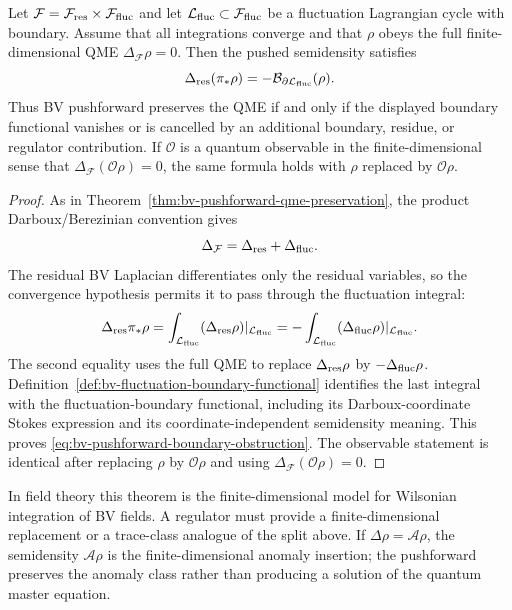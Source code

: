 \begin{proposition}
\label{prop:bv-pushforward-boundary-obstruction}
Let \(\mathcal F=\mathcal F_{\rm res}\times\mathcal F_{\rm fluc}\) and let
\(\mathcal L_{\rm fluc}\subset\mathcal F_{\rm fluc}\) be a fluctuation
Lagrangian cycle with boundary.  Assume that all integrations converge and
that \(\rho\) obeys the full finite-dimensional QME
\(\Delta_{\mathcal F}\rho=0\).  Then the pushed semidensity satisfies
\begin{equation}
  \Delta_{\rm res}(\pi_*\rho)
  =
  -\mathcal B_{\partial\mathcal L_{\rm fluc}}(\rho).
  \label{eq:bv-pushforward-boundary-obstruction}
\end{equation}
Thus BV pushforward preserves the QME if and only if the displayed boundary
functional vanishes or is cancelled by an additional boundary, residue, or
regulator contribution.  If \(\mathcal O\) is a quantum observable in the
finite-dimensional sense that
\(\Delta_{\mathcal F}(\mathcal O\rho)=0\), the same formula holds with
\(\rho\) replaced by \(\mathcal O\rho\).
\end{proposition}

\begin{proof}
As in Theorem~\ref{thm:bv-pushforward-qme-preservation}, the product
Darboux/Berezinian convention gives
\[
  \Delta_{\mathcal F}=\Delta_{\rm res}+\Delta_{\rm fluc}.
\]
The residual BV Laplacian differentiates only the residual variables, so the
convergence hypothesis permits it to pass through the fluctuation integral:
\begin{equation}
  \Delta_{\rm res}\pi_*\rho
  =
  \int_{\mathcal L_{\rm fluc}}
  (\Delta_{\rm res}\rho)|_{\mathcal L_{\rm fluc}}
  =
  -\int_{\mathcal L_{\rm fluc}}
  (\Delta_{\rm fluc}\rho)|_{\mathcal L_{\rm fluc}} .
  \label{eq:bv-boundary-pushforward-proof}
\end{equation}
The second equality uses the full QME to replace
\(\Delta_{\rm res}\rho\) by \(-\Delta_{\rm fluc}\rho\).
Definition~\ref{def:bv-fluctuation-boundary-functional} identifies the last integral
with the fluctuation-boundary functional, including its Darboux-coordinate
Stokes expression and its coordinate-independent semidensity meaning.  This
proves \eqref{eq:bv-pushforward-boundary-obstruction}.  The observable
statement is identical after replacing \(\rho\) by \(\mathcal O\rho\) and
using \(\Delta_{\mathcal F}(\mathcal O\rho)=0\).
\end{proof}

In field theory this theorem is the finite-dimensional model for Wilsonian
integration of BV fields.  A regulator must provide a finite-dimensional
replacement or a trace-class analogue of the split above.  If
\(\Delta\rho=\mathcal A\rho\), the semidensity \(\mathcal A\rho\) is the
finite-dimensional anomaly insertion; the pushforward preserves the anomaly
class rather than producing a solution of the quantum master equation.


